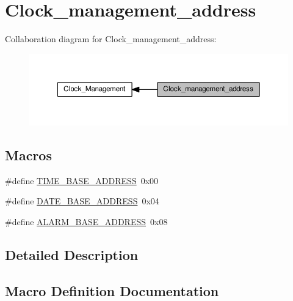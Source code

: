 \hypertarget{group___clock__management__address}{}\section{Clock\+\_\+management\+\_\+address}
\label{group___clock__management__address}
Collaboration diagram for Clock\+\_\+management\+\_\+address\+:\nopagebreak
\begin{figure}[H]
\begin{center}
\leavevmode
\includegraphics[width=350pt]{d4/d4a/group___clock__management__address}
\end{center}
\end{figure}
\subsection*{Macros}
\begin{DoxyCompactItemize}
\item 
\#define \hyperlink{group___clock__management__address_ga8ee07883213a94b7c2de6f560a3b7073}{T\+I\+M\+E\+\_\+\+B\+A\+S\+E\+\_\+\+A\+D\+D\+R\+E\+SS}~0x00
\item 
\#define \hyperlink{group___clock__management__address_ga31d7b2bb8de218af4333c18718955628}{D\+A\+T\+E\+\_\+\+B\+A\+S\+E\+\_\+\+A\+D\+D\+R\+E\+SS}~0x04
\item 
\#define \hyperlink{group___clock__management__address_gab2393255a8e2127df1aca26ece13641f}{A\+L\+A\+R\+M\+\_\+\+B\+A\+S\+E\+\_\+\+A\+D\+D\+R\+E\+SS}~0x08
\end{DoxyCompactItemize}


\subsection{Detailed Description}


\subsection{Macro Definition Documentation}
